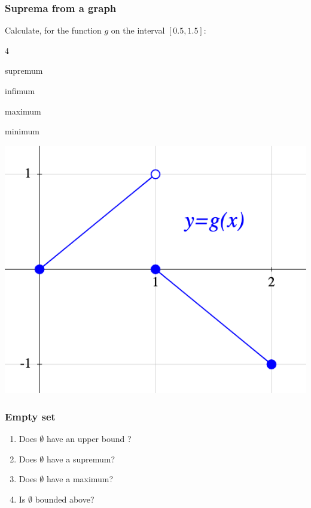 \documentclass[14pt]{beamer}
\newcommand{\setsize}[1]{\fontsize{#1}{#1}\selectfont} %
\newcommand{\smallerfont}{\setsize{13}} %
\begin{document}
	\begin{frame}[t]
		\smallerfont
		\frametitle{Suprema from a graph}

		Calculate, for the function $g$ on the interval $[0.5, 1.5]$:
		\begin{enumerate}
		\end{enumerate}

		\begin{center}
			\includegraphics[scale=.35]{G20}
		\end{center}
	\end{frame}
	\begin{frame}[t]
		\frametitle{Empty set}

		\begin{enumerate}
			\item Does $\emptyset$ have an upper bound ?

			\item Does $\emptyset$ have a supremum?

			\item Does $\emptyset$ have a maximum?

			\item Is $\emptyset$ bounded above?
		\end{enumerate}
	\end{frame}
\end{document}
